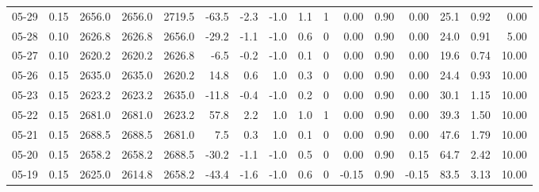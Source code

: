 \begin{threeparttable}
{\begin{tabular}{lrrrrrrrrrrrrrrr}
  05-29 &     0.15 & 2656.0 & 2656.0 & 2719.5 &      -63.5 &           -2.3 &                     -1.0 &                 1.1 &              1 &       0.00 &      0.90 &           0.00 &             25.1 &            0.92 &                   0.00 \\
  05-28 &     0.10 & 2626.8 & 2626.8 & 2656.0 &      -29.2 &           -1.1 &                     -1.0 &                 0.6 &              0 &       0.00 &      0.90 &           0.00 &             24.0 &            0.91 &                   5.00 \\
  05-27 &     0.10 & 2620.2 & 2620.2 & 2626.8 &       -6.5 &           -0.2 &                     -1.0 &                 0.1 &              0 &       0.00 &      0.90 &           0.00 &             19.6 &            0.74 &                  10.00 \\
  05-26 &     0.15 & 2635.0 & 2635.0 & 2620.2 &       14.8 &            0.6 &                      1.0 &                 0.3 &              0 &       0.00 &      0.90 &           0.00 &             24.4 &            0.93 &                  10.00 \\
  05-23 &     0.15 & 2623.2 & 2623.2 & 2635.0 &      -11.8 &           -0.4 &                     -1.0 &                 0.2 &              0 &       0.00 &      0.90 &           0.00 &             30.1 &            1.15 &                  10.00 \\
  05-22 &     0.15 & 2681.0 & 2681.0 & 2623.2 &       57.8 &            2.2 &                      1.0 &                 1.0 &              1 &       0.00 &      0.90 &           0.00 &             39.3 &            1.50 &                  10.00 \\
  05-21 &     0.15 & 2688.5 & 2688.5 & 2681.0 &        7.5 &            0.3 &                      1.0 &                 0.1 &              0 &       0.00 &      0.90 &           0.00 &             47.6 &            1.79 &                  10.00 \\
  05-20 &     0.15 & 2658.2 & 2658.2 & 2688.5 &      -30.2 &           -1.1 &                     -1.0 &                 0.5 &              0 &       0.00 &      0.90 &           0.15 &             64.7 &            2.42 &                  10.00 \\
  05-19 &     0.15 & 2625.0 & 2614.8 & 2658.2 &      -43.4 &           -1.6 &                     -1.0 &                 0.6 &              0 &      -0.15 &      0.90 &          -0.15 &             83.5 &            3.13 &                  10.00 \\

\end{tabular}}
\end{threeparttable}
